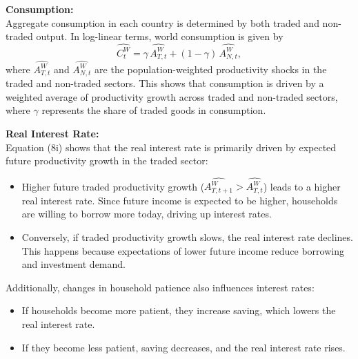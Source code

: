 \documentclass[a4paper,12pt]{article} %
\theoremstyle{nonitalic}
\begin{document}
\textbf{Consumption:} \\
Aggregate consumption in each country is determined by both traded and non-traded output. In log-linear terms, world consumption is given by
\[
\widehat{C_t^W} = \gamma\,\widehat{A_{T,t}^W} + (1-\gamma)\,\widehat{A_{N,t}^W},
\]
where \( \widehat{A_{T,t}^W} \) and \( \widehat{A_{N,t}^W} \) are the population-weighted productivity shocks in the traded and non-traded sectors. 
This shows that consumption is driven by a weighted average of productivity growth across traded and non-traded sectors, where $\gamma$ represents the share of traded goods in consumption.

\textbf{Real Interest Rate:}  \\
Equation (8i) shows that the real interest rate is primarily driven by expected future productivity growth in the traded sector:
\begin{itemize}
    \item Higher future traded productivity growth ($\widehat{A_{T,t+1}^W} > \widehat{A_{T,t}^W}$) leads to a higher real interest rate. Since future income is expected to be higher, households are willing to borrow more today, driving up interest rates.
    \item Conversely, if traded productivity growth slows, the real interest rate declines. This happens because expectations of lower future income reduce borrowing and investment demand.
\end{itemize}
Additionally, changes in household patience also influences interest rates:
\begin{itemize}
    \item If households become more patient, they increase saving, which lowers the real interest rate.
    \item If they become less patient, saving decreases, and the real interest rate rises.
\end{itemize}


\end{document}
